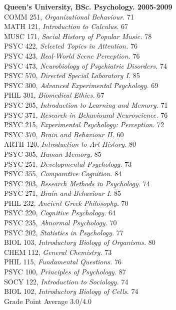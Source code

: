 \documentclass[10pt,oneside,a4paper]{report}
\begin{document}
\begin{flushleft}
\textbf{Queen's University, BSc. Psychology. \hfill 2005-2009} \\

COMM 251, \textit{Organizational Behaviour.} \hfill 71 \\
MATH 121, \textit{Introduction to Calculus.} \hfill 67 \\
MUSC 171, \textit{Social History of Popular Music.} \hfill 78 \\
PSYC 422, \textit{Selected Topics in Attention.} \hfill 76 \\
PSYC 423, \textit{Real-World Scene Perception.} \hfill 76 \\
PSYC 473, \textit{Neurobiology of Psychiatric Disorders.} \hfill 74 \\
PSYC 570, \textit{Directed Special Laboratory I.} \hfill 85 \\
PSYC 300, \textit{Advanced Experimental Psychology.} \hfill 69 \\
PHIL 301, \textit{Biomedical Ethics.} \hfill 67 \\
PSYC 205, \textit{Introduction to Learning and Memory.} \hfill 71 \\
PSYC 371, \textit{Research in Behavioural Neuroscience.} \hfill 76 \\
PSYC 215, \textit{Experimental Psychology: Perception.} \hfill 72 \\
PSYC 370, \textit{Brain and Behaviour II.} \hfill 60 \\
ARTH 120, \textit{Introduction to Art History.} \hfill 80 \\
PSYC 305, \textit{Human Memory.} \hfill 85 \\
PSYC 251, \textit{Developmental Psychology.} \hfill 73 \\
PSYC 355, \textit{Comparative Cognition.} \hfill 84 \\
PSYC 203, \textit{Research Methods in Psychology.} \hfill 74 \\
PSYC 271, \textit{Brain and Behaviour I.} \hfill 85 \\
PHIL 232, \textit{Ancient Greek Philosophy.} \hfill 70 \\
PSYC 220, \textit{Cognitive Psychology.} \hfill 64 \\
PSYC 235, \textit{Abnormal Psychology.} \hfill 70 \\
PSYC 202, \textit{Statistics in Psychology.} \hfill 77 \\
BIOL 103, \textit{Introductory Biology of Organisms.} \hfill 80 \\
CHEM 112, \textit{General Chemistry.} \hfill 73 \\
PHIL 115, \textit{Fundamental Questions.} \hfill 76 \\
PSYC 100, \textit{Principles of Psychology.} \hfill 87 \\
SOCY 122, \textit{Introduction to Sociology.} \hfill 74 \\
BIOL 102, \textit{Introductory Biology of Cells.} \hfill 74 \\
Grade Point Average \hfill 3.0/4.0 \\\
\end{flushleft}
\end{document}
